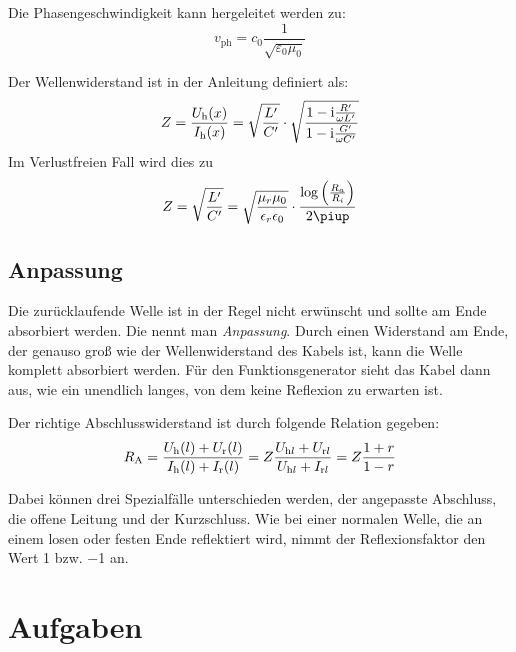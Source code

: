 Die Phasengeschwindigkeit kann hergeleitet werden zu:
\begin{equation}
	\label{eq:1.13}
	v_\text{ph} = c_0 \frac{1}{\sqrt{\varepsilon_0 \mu_0}}
\end{equation}

Der Wellenwiderstand ist in der Anleitung definiert als:
\begin{equation}
	\label{eq:1.14}
	Z = \frac{U_\text h (x)}{I_\text h (x)} = \sqrt{\frac{L'}{C'}}\cdot\sqrt{\frac{1-\mathrm i\frac{R'}{\omega L'}}{1-\mathrm i\frac{G'}{\omega C'}}}
\end{equation}
Im Verlustfreien Fall wird dies zu
\begin{equation}
	\label{eq:1.15}
	Z = \sqrt{\frac{L'}{C'}} = \sqrt{\frac{\mu_r\mu_0}{\epsilon_r\epsilon_0}}\cdot\frac{\log\del{\frac{R_a}{R_i}}}{2\piup}
	\end{equation}

\subsection{Anpassung}

Die zurücklaufende Welle ist in der Regel nicht erwünscht und sollte am Ende
absorbiert werden. Die nennt man \emph{Anpassung}. Durch einen Widerstand am
Ende, der genauso groß wie der Wellenwiderstand des Kabels ist, kann die Welle
komplett absorbiert werden. Für den Funktionsgenerator sieht das Kabel dann
aus, wie ein unendlich langes, von dem keine Reflexion zu erwarten ist.

Der richtige Abschlusswiderstand ist durch folgende Relation gegeben:
\begin{equation}
	\label{eq:1.17}
	R_\text A
	= \frac{U_\text h (l) + U_\text r (l)}{I_\text h (l) + I_\text r (l)}
	= Z \frac{U_{\text h l} + U_{\text r l}}{U_{\text h l} + I_{\text r l}}
	= Z \frac{1+r}{1-r}
\end{equation}

Dabei können drei Spezialfälle unterschieden werden, der angepasste Abschluss,
die offene Leitung und der Kurzschluss. Wie bei einer normalen Welle, die an
einem losen oder festen Ende reflektiert wird, nimmt der Reflexionsfaktor den
Wert \num{+1} bzw. \num{-1} an.


\section{Aufgaben}

